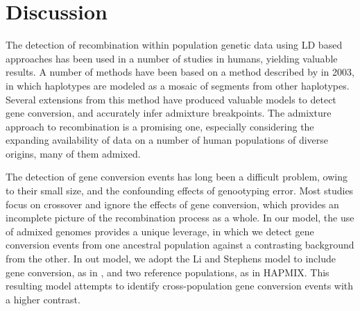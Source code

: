

\section{Discussion}

The detection of recombination within population genetic data using LD based approaches has been used in a number of studies in humans, yielding valuable results\cite{Mcvean2004,Myers2005,hapmap2007}.
A number of methods have been based on a method described by \citet{Li2003} in 2003, in which haplotypes are modeled as a mosaic of segments from other haplotypes.
Several extensions from this method have produced valuable models to detect gene conversion\cite{Gay2007}, and accurately infer admixture breakpoints\cite{Price2009,Hinch2011}.
The admixture approach to recombination is a promising one, especially considering the expanding availability of data on a number of human populations of diverse origins, many of them admixed.

The detection of gene conversion events has long been a difficult problem, owing to their small size, and the confounding effects of genootyping error.
Most studies focus on crossover and ignore the effects of gene conversion, which provides an incomplete picture of the recombination process as a whole.
In our model, the use of admixed genomes provides a unique leverage, in which we detect gene conversion events from one ancestral population against a contrasting background from the other.
In out model, we adopt the Li and Stephens model to include gene conversion, as in \citet{Gay2007}, and two reference populations, as in HAPMIX\cite{Price2009}.
This resulting model attempts to identify cross-population gene conversion events with a higher contrast.


